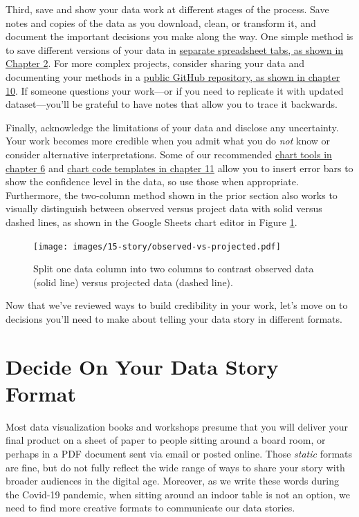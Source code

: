 \documentclass[
  english,
]{book}
\begin{document}
Third, save and show your data work at different stages of the process. Save notes and copies of the data as you download, clean, or transform it, and document the important decisions you make along the way. One simple method is to save different versions of your data in \href{spreadsheet.html}{separate spreadsheet tabs, as shown in Chapter 2}. For more complex projects, consider sharing your data and documenting your methods in a \href{github.html}{public GitHub repository, as shown in chapter 10}. If someone questions your work---or if you need to replicate it with updated dataset---you'll be grateful to have notes that allow you to trace it backwards.

Finally, acknowledge the limitations of your data and disclose any uncertainty. Your work becomes more credible when you admit what you do \emph{not} know or consider alternative interpretations. Some of our recommended \href{chart.html}{chart tools in chapter 6} and \href{chartcode.html}{chart code templates in chapter 11} allow you to insert error bars to show the confidence level in the data, so use those when appropriate. Furthermore, the two-column method shown in the prior section also works to visually distinguish between observed versus project data with solid versus dashed lines, as shown in the Google Sheets chart editor in Figure \ref{fig:observed-vs-projected}.



\begin{figure}
\centering
\texttt{[image: images/15-story/observed-vs-projected.pdf]}
\caption{\label{fig:observed-vs-projected}Split one data column into two columns to contrast observed data (solid line) versus projected data (dashed line).}
\end{figure}

Now that we've reviewed ways to build credibility in your work, let's move on to decisions you'll need to make about telling your data story in different formats.

\hypertarget{story-format}{%
\section*{Decide On Your Data Story Format}\label{story-format}}

Most data visualization books and workshops presume that you will deliver your final product on a sheet of paper to people sitting around a board room, or perhaps in a PDF document sent via email or posted online. Those \emph{static} formats are fine, but do not fully reflect the wide range of ways to share your story with broader audiences in the digital age. Moreover, as we write these words during the Covid-19 pandemic, when sitting around an indoor table is not an option, we need to find more creative formats to communicate our data stories.
\end{document}
